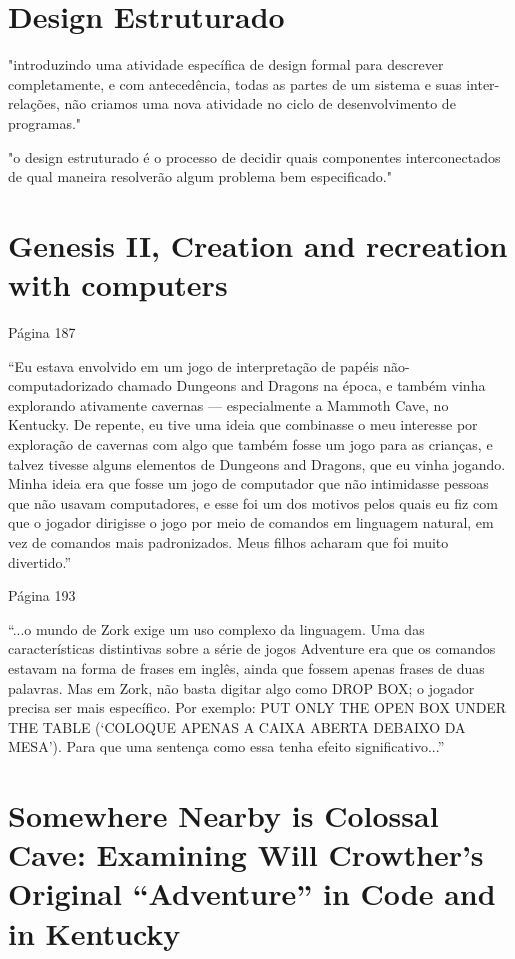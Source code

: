 \documentclass[12pt,a4paper]{article}
\begin{document}
\section{Design Estruturado}
\textcite{yourdon1979structured} 

"introduzindo uma atividade específica de design formal para descrever completamente, e com antecedência, todas as partes de um sistema e suas inter-relações, não criamos uma nova atividade no ciclo de desenvolvimento de programas." 

"o design estruturado é o processo de decidir quais componentes interconectados de qual maneira resolverão algum problema bem especificado."

\section{Genesis II, Creation and recreation with computers}
\textcite{peterson1983genesis} 

Página 187

“Eu estava envolvido em um jogo de interpretação de papéis não-computadorizado chamado Dungeons and Dragons na época, e também vinha explorando ativamente cavernas — especialmente a Mammoth Cave, no Kentucky. De repente, eu tive uma ideia que combinasse o meu interesse por exploração de cavernas com algo que também fosse um jogo para as crianças, e talvez tivesse alguns elementos de Dungeons and Dragons, que eu vinha jogando. Minha ideia era que fosse um jogo de computador que não intimidasse pessoas que não usavam computadores, e esse foi um dos motivos pelos quais eu fiz com que o jogador dirigisse o jogo por meio de comandos em linguagem natural, em vez de comandos mais padronizados.
Meus filhos acharam que foi muito divertido.”

Página 193

“...o mundo de Zork exige um uso complexo da linguagem.
Uma das características distintivas sobre a série de jogos Adventure era que os comandos estavam na forma de frases em inglês, ainda que fossem apenas frases de duas palavras.
Mas em Zork, não basta digitar algo como DROP BOX; o jogador precisa ser mais específico.
Por exemplo: PUT ONLY THE OPEN BOX UNDER THE TABLE (‘COLOQUE APENAS A CAIXA ABERTA DEBAIXO DA MESA’).
Para que uma sentença como essa tenha efeito significativo...”

\section{Somewhere Nearby is Colossal Cave: Examining Will Crowther's Original “Adventure” in Code and in Kentucky}
\end{document}
